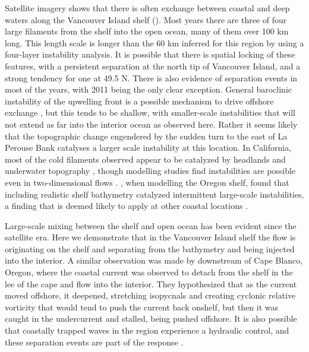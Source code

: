 \documentclass[draft]{agujournal2019}
\begin{document}
Satellite imagery shows that there is often exchange between coastal and deep waters along the Vancouver Island shelf ().  Most years there are three of four large filaments from the shelf into the open ocean, many of them over 100 km long.  This length scale is longer than the 60 km inferred for this region by  using a four-layer instability analysis.  It is possible that there is spatial locking of these features, with a persistent separation at the north tip of Vancouver Island, and a strong tendency for one at 49.5 N. There is also evidence of separation events in most of the years, with 2011 being the only clear exception. General baroclinic instability of the upwelling front is a possible mechanism to drive offshore exchange \cite{ikedaetal84,durskiallen05}, but this tends to be shallow, with smaller-scale instabilities that will not extend as far into the interior ocean as observed here.  Rather it seems likely that the topographic change engendered by the sudden turn to the east of La Perouse Bank catalyses a larger scale instability at this location.  In California, most of the cold filaments observed appear to be catalyzed by headlands and underwater topography \cite{strubetal91}, though modelling studies find instabilities are possible even in two-dimensional flows \cite{pierceetal91}.  , when modelling the Oregon shelf, found that including realistic shelf bathymetry catalyzed intermittent large-scale instabilities, a finding that is deemed likely to apply at other coastal locations \cite{batteen97}.

Large-scale mixing between the shelf and open ocean has been evident since the satellite era.  Here we demonstrate that in the Vancouver Island shelf the flow is originating on the shelf and separating from the bathymetry and being injected into the interior.  A  similar observation was made by  downstream of Cape Blanco, Oregon, where the coastal current was observed to detach from the shelf in the lee of the cape and flow into the interior.  They hypothesized that as the current moved offshore, it deepened, stretching isopycnals and creating cyclonic relative vorticity that would tend to push the current back onshelf, but then it was caught in the undercurrent and stalled, being pushed offshore. It is also possible that coastally trapped waves in the region experience a hydraulic control, and these separation events are part of the response \cite{dalebarth01}.
\end{document}
